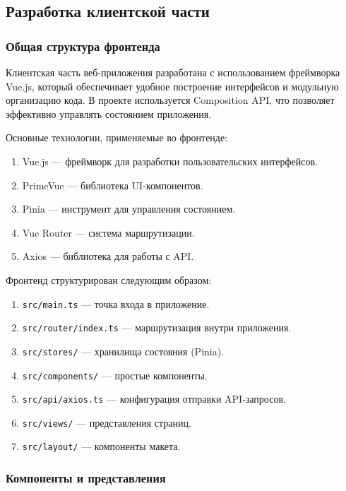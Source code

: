 \subsection{Разработка клиентской части}

\subsubsection{Общая структура фронтенда}

Клиентская часть веб-приложения разработана с использованием фреймворка Vue.js, который обеспечивает удобное построение интерфейсов и модульную организацию кода. В проекте используется Composition API, что позволяет эффективно управлять состоянием приложения.

Основные технологии, применяемые во фронтенде:
\begin{enumerate}
    \item Vue.js — фреймворк для разработки пользовательских интерфейсов.
    \item PrimeVue — библиотека UI-компонентов.
    \item Pinia — инструмент для управления состоянием.
    \item Vue Router — система маршрутизации.
    \item Axios — библиотека для работы с API.
\end{enumerate}

Фронтенд структурирован следующим образом:
\begin{enumerate}
    \item \texttt{src/main.ts} — точка входа в приложение.
    \item \texttt{src/router/index.ts} — маршрутизация внутри приложения.
    \item \texttt{src/stores/} — хранилища состояния (Pinia).
    \item \texttt{src/components/} — простые компоненты.
    \item \texttt{src/api/axios.ts} — конфигурация отправки API-запросов.
    \item \texttt{src/views/} — представления страниц.
    \item \texttt{src/layout/} — компоненты макета.
\end{enumerate}

\subsubsection{Компоненты и представления}

